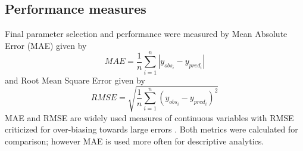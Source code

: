 \subsection{Performance measures}
Final parameter selection and performance were measured by Mean Absolute Error (MAE) given by 
%
\begin{equation}
\label{eq:MAE}
MAE = \frac{1}{n}\sum^{n}_{i=1} \left | y_{obs_{i}}- y_{pred_{i}} \right |
\end{equation}
%
and Root Mean Square Error given by
%
\begin{equation}
\label{eq:RMSE}
RMSE = \sqrt{\frac{1}{n}\sum^{n}_{i=1} \left ( y_{obs_{i}}- y_{pred_{i}} \right )^{2}}
\end{equation}
MAE and RMSE are widely used measures of continuous variables with RMSE criticized for over-biasing towards large errors \citep{Chai2014, Willmott2005}. Both metrics were calculated for comparison; however MAE is used more often for descriptive analytics.
